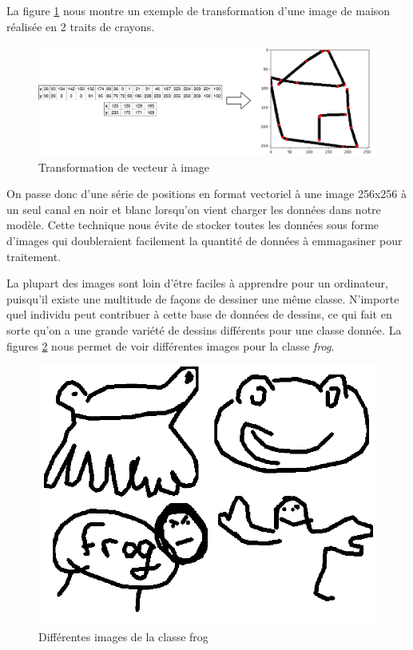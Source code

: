 

La figure \ref{transformationimage} nous montre un exemple de transformation d'une image de maison réalisée en 2 traits de crayons. 

\begin{figure}[h]
	\includegraphics[width=\linewidth]{images/Transformations_horizontal.pdf} %
	\caption{Transformation de vecteur à image} %
	\label{transformationimage} 
\end{figure}

On passe donc d'une série de positions en format vectoriel à une image 256x256 à un seul canal en noir et blanc lorsqu'on vient charger les données dans notre modèle. 
Cette technique nous évite de stocker toutes les données sous forme d'images qui doubleraient facilement la quantité de données à emmagasiner pour traitement. 


La plupart des images sont loin d'être faciles à apprendre pour un ordinateur, puisqu'il existe une multitude de façons de dessiner une même classe.
N'importe quel individu peut contribuer à cette base de données de dessins, ce qui fait en sorte qu'on a une grande variété de dessins différents pour une classe donnée. La figures \ref{frogs} nous permet de voir différentes images pour la classe \emph{frog}.


\begin{figure}[h]
	\includegraphics[width=\linewidth]{images/Combo_frogs.png} %
	\caption{Différentes images de la classe frog} %
	\label{frogs} 
\end{figure}


